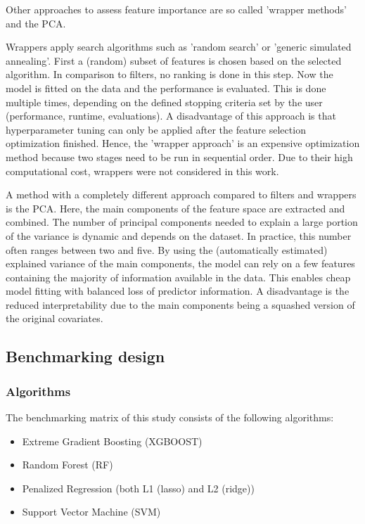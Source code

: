 \documentclass[letterpaper, peerreview]{IEEEtran}
\begin{document}
\noindent Other approaches to assess feature importance are so called 'wrapper methods' and the \ac{PCA}\cite{das2001, jolliffe2016}.

\noindent Wrappers \cite{chandrashekar2014, kohavi1997} apply search algorithms such as 'random search' or 'generic simulated annealing'.
First a (random) subset of features is chosen based on the selected algorithm.
In comparison to filters, no ranking is done in this step.
Now the model is fitted on the data and the performance is evaluated.
This is done multiple times, depending on the defined stopping criteria set by the user (performance, runtime, evaluations).
A disadvantage of this approach is that hyperparameter tuning can only be applied after the feature selection optimization finished.
Hence, the 'wrapper approach' is an expensive optimization method because two stages need to be run in sequential order.
Due to their high computational cost, wrappers were not considered in this work.

A method with a completely different approach compared to filters and wrappers is the \ac{PCA}\cite{pearson1901, jolliffe2016}.
Here, the main components of the feature space are extracted and combined.
The number of principal components needed to explain a large portion of the variance is dynamic and depends on the dataset.
In practice, this number often ranges between two and five.
By using the (automatically estimated) explained variance of the main components, the model can rely on a few features containing the majority of information available in the data.
This enables cheap model fitting with balanced loss of predictor information.
A disadvantage is the reduced interpretability due to the main components being a squashed version of the original covariates.

\subsection{Benchmarking design}

\subsubsection{Algorithms}

\noindent The benchmarking matrix of this study consists of the following algorithms:

\begin{itemize}
	\item  Extreme Gradient Boosting (XGBOOST)
	\item  Random Forest (RF)
	\item  Penalized Regression (both L1 (lasso) and L2 (ridge))
	\item  Support Vector Machine (SVM)
\end{itemize}
\end{document}
